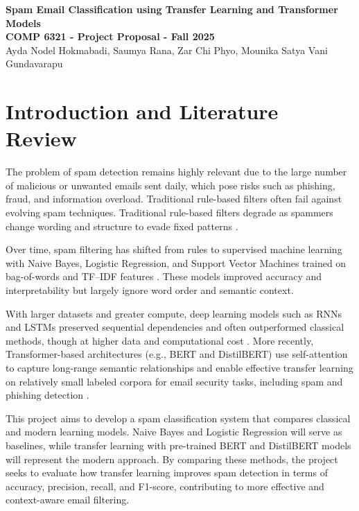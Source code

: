 \documentclass[12pt]{article}
\begin{document}
\begin{center}
{\Large \textbf{Spam Email Classification using Transfer Learning and Transformer Models}}\\[8pt]
{\small \textbf{COMP 6321 - Project Proposal - Fall 2025}}\\[5pt]
{\small Ayda Nodel Hokmabadi, Saumya Rana, Zar Chi Phyo, Mounika Satya Vani Gundavarapu}\\[3pt]
\end{center}


\section{Introduction and Literature Review}
The problem of spam detection remains highly relevant due to the large number of malicious or unwanted emails sent daily, which pose risks such as phishing, fraud, and information overload. Traditional rule-based filters often fail against evolving spam techniques. Traditional rule-based filters degrade as spammers change wording and structure to evade fixed patterns \cite{banday2009effectiveness,wang2025review}.

Over time, spam filtering has shifted from rules to supervised machine learning with Naive Bayes, Logistic Regression, and Support Vector Machines trained on bag-of-words and TF--IDF features \cite{hassan2022analytics,chavez2020nb}. These models improved accuracy and interpretability but largely ignore word order and semantic context.

With larger datasets and greater compute, deep learning models such as RNNs and LSTMs preserved sequential dependencies and often outperformed classical methods, though at higher data and computational cost \cite{johnafrica2022lstm,nasreen2024novel}. More recently, Transformer-based architectures (e.g., BERT and DistilBERT) use self-attention to capture long-range semantic relationships and enable effective transfer learning on relatively small labeled corpora for email security tasks, including spam and phishing detection \cite{tida2022universal,songailaite2023bertphish,asliyuksek2025multimodal}.

This project aims to develop a spam classification system that compares classical and modern learning models. Naive Bayes and Logistic Regression will serve as baselines, while transfer learning with pre-trained BERT and DistilBERT models will represent the modern approach. By comparing these methods, the project seeks to evaluate how transfer learning improves spam detection in terms of accuracy, precision, recall, and F1-score, contributing to more effective and context-aware email filtering.
\end{document}
